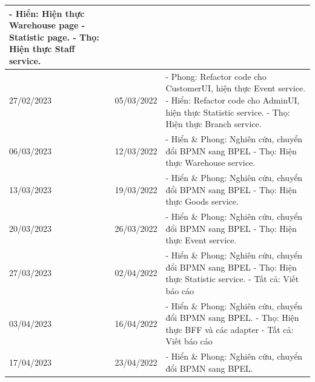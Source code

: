 {\begin{longtable}{| p{2cm} | p{2cm} | p{10cm} |}
    \newline
    - Hiển: Hiện thực Warehouse page - Statistic page.
    \newline
    - Thọ: Hiện thực Staff service.                                                                  \\
    \hline
    27/02/2023       & 05/03/2022   &
    - Phong: Refactor code cho CustomerUI, hiện thực Event service.
    \newline
    - Hiển: Refactor code cho AdminUI, hiện thực Statistic service.
    \newline
    - Thọ: Hiện thực Branch service.                                                                 \\
    \hline
    06/03/2023       & 12/03/2022   &
    - Hiển           \& Phong: Nghiên cứu, chuyển đổi BPMN sang BPEL
    \newline
    - Thọ: Hiện thực Warehouse service.                                                              \\
    \hline
    13/03/2023       & 19/03/2022   &
    - Hiển           \& Phong: Nghiên cứu, chuyển đổi BPMN sang BPEL
    \newline
    - Thọ: Hiện thực Goods service.                                                                  \\
    \hline
    20/03/2023       & 26/03/2022   &
    - Hiển           \& Phong: Nghiên cứu, chuyển đổi BPMN sang BPEL
    \newline
    - Thọ: Hiện thực Event service.                                                                  \\
    \hline
    27/03/2023       & 02/04/2022   &
    - Hiển           \& Phong: Nghiên cứu, chuyển đổi BPMN sang BPEL
    \newline
    - Thọ: Hiện thực Statistic service.
    \newline
    - Tất cả: Viết báo cáo                                                                           \\
    \hline
    03/04/2023       & 16/04/2022   &
    - Hiển           \& Phong: Nghiên cứu, chuyển đổi BPMN sang BPEL.
    \newline
    - Thọ: Hiện thực BFF và các adapter
    \newline
    - Tất cả: Viết báo cáo                                                                           \\
    \hline
    17/04/2023       & 23/04/2022   &
    - Hiển           \& Phong: Nghiên cứu, chuyển đổi BPMN sang BPEL.

\end{longtable}}
